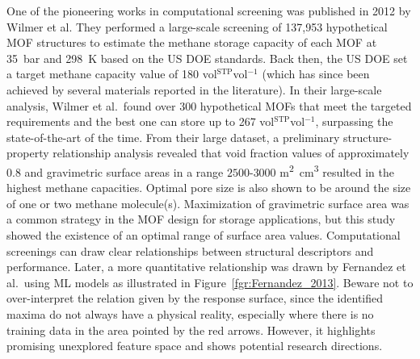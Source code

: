 \documentclass[main.tex]{subfiles}
\begin{document}
One of the pioneering works in computational screening was published in 2012 by Wilmer et al.\autocite{Wilmer_2012} They performed a large-scale screening of 137,953 hypothetical MOF structures to estimate the methane storage capacity of each MOF at \SI{35}{\bar} and \SI{298}{\kelvin} based on the US DOE standards. Back then, the US DOE set a target methane capacity value of 180 vol{\footnotesize$^\mathrm{STP}$}vol$^{-1}$ (which has since been achieved by several materials reported in the literature). In their large-scale analysis, Wilmer et al.\ found over 300 hypothetical MOFs that meet the targeted requirements and the best one can store up to 267 vol{\footnotesize$^\mathrm{STP}$}vol$^{-1}$, surpassing the state-of-the-art of the time. From their large dataset, a preliminary structure-property relationship analysis revealed that void fraction values of approximately 0.8 and gravimetric surface areas in a range $2500$-$3000$ \si{\square\meter\cubic\centi\meter} resulted in the highest methane capacities. Optimal pore size is also shown to be around the size of one or two methane molecule(s). Maximization of gravimetric surface area was a common strategy in the MOF design for storage applications, but this study showed the existence of an optimal range of surface area values. Computational screenings can draw clear relationships between structural descriptors and performance. Later, a more quantitative relationship was drawn by Fernandez et al.\ using ML models as illustrated in Figure~\ref{fgr:Fernandez_2013}. Beware not to over-interpret the relation given by the response surface, since the identified maxima do not always have a physical reality, especially where there is no training data in the area pointed by the red arrows. However, it highlights promising unexplored feature space and shows potential research directions.
\end{document}
